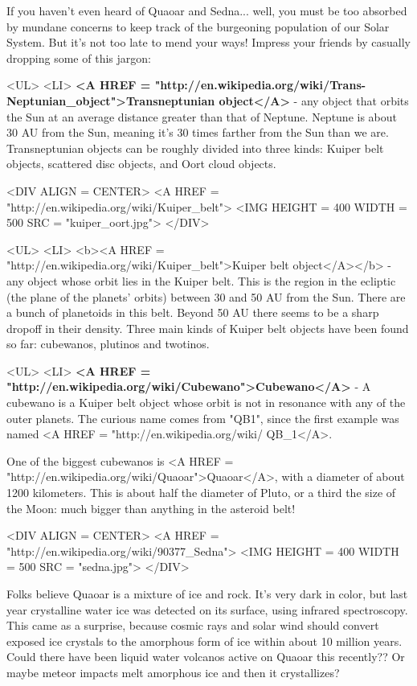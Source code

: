 If you haven't even heard of Quaoar and Sedna... well, you must be
too absorbed by mundane concerns to keep track of the burgeoning
population of our Solar System.  But it's not too late to mend your
ways!  Impress your friends by casually dropping some of this jargon:

<UL>
<LI>
  \textbf{<A HREF = "http://en.wikipedia.org/wiki/Trans-Neptunian_object">Transneptunian object</A>} - any object that orbits the Sun at an average 
  distance greater than that of Neptune.  Neptune is about 30 AU from 
  the Sun, meaning it's 30 times farther from the Sun than we are.  
  Transneptunian objects can be roughly divided into three kinds: 
  Kuiper belt objects, scattered disc objects, and Oort cloud objects.

<DIV ALIGN = CENTER>
<A HREF = "http://en.wikipedia.org/wiki/Kuiper_belt"> 
<IMG HEIGHT = 400 WIDTH = 500 SRC = "kuiper_oort.jpg">
</DIV>


<UL>
<LI>
   <b><A HREF = "http://en.wikipedia.org/wiki/Kuiper_belt">Kuiper 
   belt object</A></b> - 
   any object whose orbit lies in the Kuiper belt. 
   This is the region in the ecliptic (the plane of the planets' orbits) 
   between 30 and 50 AU from the Sun.  There are a bunch of planetoids
   in this belt.  Beyond 50 AU there seems to be a sharp dropoff in 
   their density.  Three main kinds of Kuiper belt objects have been 
   found so far: cubewanos, plutinos and twotinos.



<UL>
<LI>
    \textbf{<A HREF = "http://en.wikipedia.org/wiki/Cubewano">Cubewano</A>} - 
    A cubewano is a Kuiper belt object whose orbit is not
    in resonance with any of the outer planets.  The curious name
    comes from "QB1", since the first example was named 
    <A HREF = "http://en.wikipedia.org/wiki/%
    QB_{1}</A>.
 
    One of the biggest cubewanos is 
    <A HREF = "http://en.wikipedia.org/wiki/Quaoar">Quaoar</A>, with a 
    diameter of about 
    1200 kilometers.  This is about half the diameter of Pluto, or a 
    third the size of the Moon: much bigger than anything in the 
    asteroid belt!  


<DIV ALIGN = CENTER>
<A HREF = "http://en.wikipedia.org/wiki/90377_Sedna"> 
<IMG HEIGHT = 400 WIDTH = 500 SRC = "sedna.jpg">
</DIV>

    Folks believe Quaoar is a mixture of ice and rock.  
    It's very dark in color, but last year crystalline water ice was 
    detected on its surface, using infrared spectroscopy.   This came 
    as a surprise, because cosmic rays and solar wind should convert 
    exposed ice crystals to the amorphous form of ice within about 
    10 million years.  Could there have been liquid water volcanos 
    active on Quaoar this recently??  Or maybe meteor impacts melt 
    amorphous ice and then it crystallizes?

